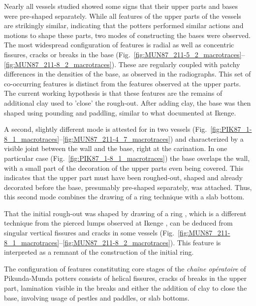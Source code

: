 \documentclass[smallextended,natbib]{svjour3}       %
\begin{document}
Nearly all vessels studied showed some signs that their upper parts and bases were pre-shaped separately. While all features of the upper parts of the vessels are strikingly similar, indicating that the potters performed similar actions and motions to shape these parts, two modes of constructing the bases were observed. The most widespread configuration of features is radial as well as concentric fissures, cracks or breaks in the base (Fig.~\ref{fig:MUN87_211-5_2_macrotraces}--\ref{fig:MUN87_211-8_2_macrotraces}). These are regularly coupled with patchy differences in the densities of the base, as observed in the radiographs. This set of co-occurring features is distinct from the features observed at the upper parts. The current working hypothesis is that these features are the remains of additional clay used to 'close' the rough-out. After adding clay, the base was then shaped using pounding and paddling, similar to what \citet{Eggert.1980c} documented at Ikenge.

A second, slightly different mode is attested for in two vessels (Fig.~\ref{fig:PIK87_1-8_1_macrotraces}--\ref{fig:MUN87_211-4_7_macrotraces}) and characterized by a visible joint between the wall and the base, right at the carination. In one particular case (Fig.~\ref{fig:PIK87_1-8_1_macrotraces}) the base overlaps the wall, with a small part of the decoration of the upper parts even being covered. This indicates that the upper part must have been roughed-out, shaped and already decorated before the base, presumably pre-shaped separately, was attached. Thus, this second mode combines the drawing of a ring technique with a slab bottom.

That the initial rough-out was shaped by drawing of a ring \citep[cf.][]{LivingstoneSmith.2010a}, which is a different technique from the pierced lumps observed at Ikenge \citep{Eggert.1980c}, can be deduced from singular vertical fissures and cracks in some vessels (Fig.~\ref{fig:MUN87_211-8_1_macrotraces}--\ref{fig:MUN87_211-8_2_macrotraces}). This feature is interpreted as a remnant of the construction of the initial ring.

The configuration of features constituting core stages of the \textit{chaîne opératoire} of Pikunda-Munda potters consists of helical fissures, cracks of breaks in the upper part, lamination visible in the breaks and either the addition of clay to close the base, involving usage of pestles and paddles, or slab bottoms. 
\end{document}

